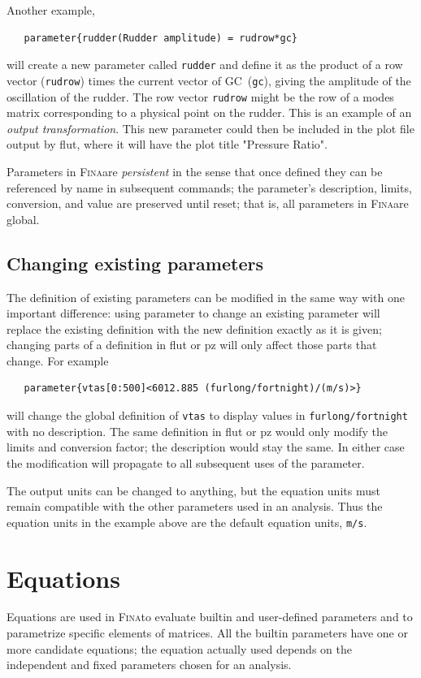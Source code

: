 \documentclass[10pt,openany,twoside]{book}
\numberwithin{equation}{section}   %
\newcommand{\Cmd}[1]{{\sf #1}}
\newcommand{\Newterm}[1]{{\em #1}}
\newcommand{\Code}[1]{{\small\tt #1}}
\newcommand{\Fina}{{\normalfont\scshape Fina\:}}
\newcommand{\Gc}{GC}
\begin{document}
Another example,
\begin{lstlisting}
   parameter{rudder(Rudder amplitude) = rudrow*gc}
\end{lstlisting}
will create a new parameter called \Code{rudder} and
define it as the product of a row vector (\Code{rudrow}) times
the current vector of \Gc\ (\Code{gc}), giving the
amplitude of the oscillation of the rudder. The row vector \Code{rudrow}
might be the row of a modes matrix corresponding to a physical point
on the rudder. This is an example of an \Newterm{output transformation}.
This new parameter could then be included in the plot file
output by \Cmd{flut}, where it will have the plot title "Pressure Ratio".
\par
Parameters in \Fina are \Newterm{persistent} in the
sense that once defined they can be referenced by name in subsequent
commands; the parameter's description, limits, conversion,
and value are preserved until reset; that is, all parameters in
\Fina are global.

\subsection{Changing existing parameters}\label{sect:changing-par}
The definition of existing parameters can be modified in the
same way with one important difference: using \Cmd{parameter}
to change an existing parameter will replace the existing
definition with the new definition exactly as it is given;
changing parts of a definition in \Cmd{flut} or \Cmd{pz}
will only affect those parts that change. For example
\begin{lstlisting}
   parameter{vtas[0:500]<6012.885 (furlong/fortnight)/(m/s)>}
\end{lstlisting}
will change the global definition of \Code{vtas} to display
values in \Code{furlong/fortnight} with no description.
The same definition in \Cmd{flut} or \Cmd{pz} would only
modify the limits and conversion factor; the description
would stay the same.
In either case the modification will propagate to all subsequent
uses of the parameter.

The output units can be changed to anything, but the
equation units must remain compatible with the other
parameters used in an analysis. Thus the equation units
in the example above are the default equation units, \Code{m/s}.

\section{Equations}\label{sect:equations}
Equations are used in \Fina to evaluate builtin and user-defined parameters
and to parametrize specific elements of matrices.
All the builtin parameters have one or more candidate equations; the equation actually
used depends on the independent and fixed parameters chosen for an analysis.
\end{document}

